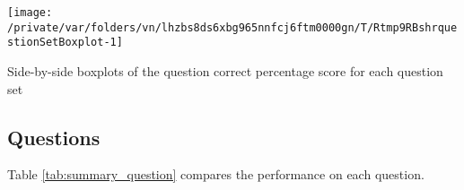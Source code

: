 \documentclass[12pt,english,nohyper]{tufte-handout}\usepackage[]{graphicx}\usepackage[]{color}
\newenvironment{knitrout}{}{} %
\begin{document}
\begin{knitrout}
\color{fgcolor}\begin{marginfigure}

{\centering \texttt{[image: /private/var/folders/vn/lhzbs8ds6xbg965nnfcj6ftm0000gn/T/Rtmp9RBshrquestionSetBoxplot-1]} 

}

\caption[Side-by-side boxplots of the question correct percentage score for each question set]{Side-by-side boxplots of the question correct percentage score for each question set}\label{fig:questionSetBoxplot}
\end{marginfigure}


\end{knitrout}

\clearpage
\newpage{}
\subsection{Questions}

Table \ref{tab:summary_question} compares the performance on each question.
\end{document}
